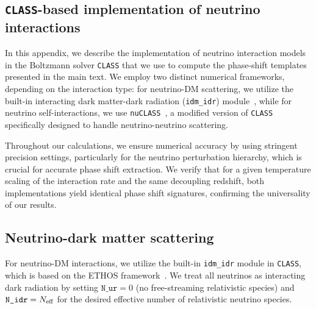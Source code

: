\begin{subappendices}

\section{\texttt{CLASS}-based implementation of neutrino interactions}\label{sec:ch13-A1}

\noindent In this appendix, we describe the implementation of neutrino interaction models in the Boltzmann solver \texttt{CLASS} that we use to compute the phase-shift templates presented in the main text. We employ two distinct numerical frameworks, depending on the interaction type: for neutrino-DM scattering, we utilize the built-in interacting dark matter-dark radiation (\texttt{idm\_idr}) module~\cite{Archidiacono:2019wdp}, while for neutrino self-interactions, we use \texttt{nuCLASS}~\cite{Libanore:2025ack}, a modified version of \texttt{CLASS} specifically designed to handle neutrino-neutrino scattering.

Throughout our calculations, we ensure numerical accuracy by using stringent precision settings, particularly for the neutrino perturbation hierarchy, which is crucial for accurate phase shift extraction. We verify that for a given temperature scaling of the interaction rate and the same decoupling redshift, both implementations yield identical phase shift signatures, confirming the universality of our results.

\subsection{Neutrino-dark matter scattering}
\noindent For neutrino-DM interactions, we utilize the built-in \texttt{idm\_idr} module  in \texttt{CLASS}, which is based on the ETHOS framework~\cite{Cyr-Racine:2015ihg}. We treat all neutrinos as interacting dark radiation by setting $\texttt{N\_ur}=0$  (no free-streaming relativistic species) and $\texttt{N\_idr}=N_{\rm eff}$ for the desired effective number of relativistic neutrino species.


\end{subappendices}
